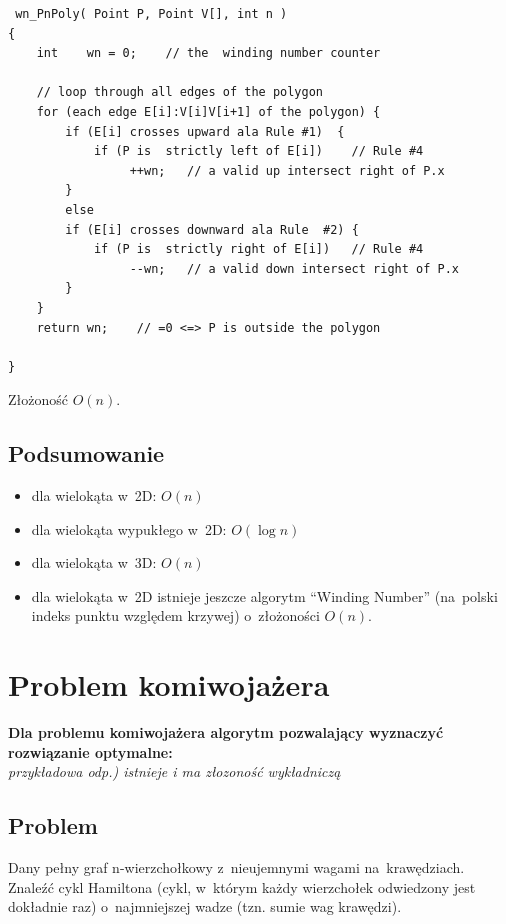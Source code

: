 \begin{lstlisting}
 wn_PnPoly( Point P, Point V[], int n )
{
    int    wn = 0;    // the  winding number counter

    // loop through all edges of the polygon
    for (each edge E[i]:V[i]V[i+1] of the polygon) {
        if (E[i] crosses upward ala Rule #1)  {
            if (P is  strictly left of E[i])    // Rule #4
                 ++wn;   // a valid up intersect right of P.x
        }
        else
        if (E[i] crosses downward ala Rule  #2) {
            if (P is  strictly right of E[i])   // Rule #4
                 --wn;   // a valid down intersect right of P.x
        }
    }
    return wn;    // =0 <=> P is outside the polygon

}
\end{lstlisting}

Złożoność $O(n)$.
\subsection{Podsumowanie}
\begin{itemize}
 \item dla wielokąta w~2D: $O(n)$
 \item dla wielokąta wypukłego w~2D: $O(\log n)$
 \item dla wielokąta w~3D: $O(n)$
 \item dla wielokąta w~2D istnieje jeszcze algorytm ``Winding Number'' (na~polski indeks punktu względem krzywej) o~złożoności $O(n)$.
\end{itemize}

\section{Problem komiwojażera}

\textbf{Dla problemu komiwojażera algorytm pozwalający wyznaczyć rozwiązanie optymalne:}\\
\textit{przykładowa odp.) istnieje i ma złozoność wykładniczą}

\vspace{0.4cm}


\subsection{Problem}
 Dany pełny graf n-wierzchołkowy z~nieujemnymi wagami na~krawędziach. Znaleźć cykl Hamiltona (cykl, w~którym każdy wierzchołek odwiedzony jest dokładnie raz) o~najmniejszej wadze (tzn. sumie wag krawędzi).
 
